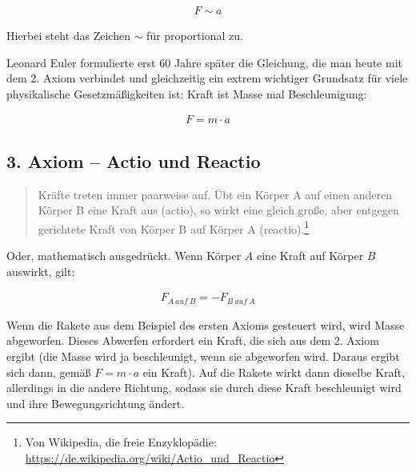 \begin{align}
	F \sim a
\end{align}

\noindent Hierbei steht das Zeichen $\sim$ für \glqq proportional zu\grqq . 

Leonard Euler formulierte erst 60 Jahre später die Gleichung, die man heute mit dem 2. Axiom verbindet und gleichzeitig ein extrem wichtiger Grundsatz für viele physikalische Gesetzmäßigkeiten ist: \glqq Kraft ist Masse mal Beschleunigung\grqq :

\begin{align}	\label{eq:2.axiom}
	F = m \cdot a
\end{align}


\subsection{3. Axiom -- Actio und Reactio}

\begin{quote}
\glqq Kräfte treten immer paarweise auf. Übt ein Körper A auf einen anderen Körper B eine Kraft aus (actio), so wirkt eine gleich große, aber entgegen gerichtete Kraft von Körper B auf Körper A (reactio).\grqq \footnote{Von Wikipedia, die freie Enzyklopädie: \url{https://de.wikipedia.org/wiki/Actio_und_Reactio}}
\end{quote}

\noindent Oder, mathematisch ausgedrückt. Wenn Körper $A$ eine Kraft auf Körper $B$ auswirkt, gilt:

\begin{align}
	F_{A \ auf \ B} = -F_{B \ auf \ A}
\end{align}

\begin{Beispiel}
	Wenn die Rakete aus dem Beispiel des ersten Axioms gesteuert wird, wird Masse abgeworfen. Dieses Abwerfen erfordert ein Kraft, die sich aus dem 2. Axiom ergibt (die Masse wird ja beschleunigt, wenn sie abgeworfen wird. Daraus ergibt sich dann, gemäß $F=m \cdot a$ ein Kraft). Auf die Rakete wirkt dann dieselbe Kraft, allerdings in die andere Richtung, sodass sie durch diese Kraft beschleunigt wird und ihre Bewegungsrichtung ändert.
\end{Beispiel}





